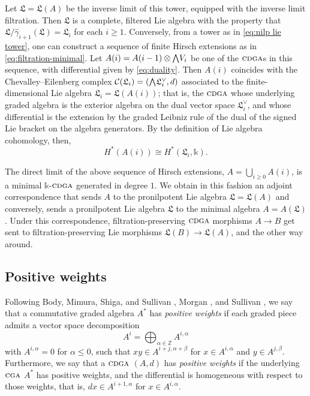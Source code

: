 \documentclass{article}
\numberwithin{equation}{section}
\theoremstyle{definition}
\newcommand{\Z}{\mathbb{Z}}
\renewcommand{\k}{\mathbb{k}}
\newcommand{\fL}{\mathfrak{L}}
\newcommand{\cga}{\ensuremath{\textsc{cga}}}
\newcommand{\cdga}{\ensuremath{\textsc{cdga}}}
\newcommand{\bwedge}{\mbox{\normalsize $\bigwedge$}}
\begin{document}
Let $\fL=\fL(A)$ be the inverse limit of this tower, equipped with the 
inverse limit filtration. Then $\fL$ is a complete, filtered Lie algebra 
with the property that $\fL/\widehat{\gamma}_{i+1}( \fL)=\fL_i$ 
for each $i\ge 1$.  Conversely, from a tower as in \eqref{eq:nilp lie tower}, 
one can construct a sequence of finite Hirsch extensions as 
in \eqref{eq:filtration-minimal}.  Let $A(i)=A(i-1)\otimes \bwedge V_{i}$ 
be one of the $\cdga$s in this sequence, with differential given by \eqref{eq:duality}.  
Then $A(i)$ coincides with the Chevalley--Eilenberg complex
$\mathcal{C}(\fL_i)=(\bwedge \fL_i^{\vee},d)$ associated to the finite-dimensional 
Lie algebra $\fL_i=\fL(A(i))$; that is, the $\cdga$ whose underlying 
graded algebra is the exterior algebra on the dual vector space 
$\fL_i^{\vee}$, and whose differential is the extension by the graded 
Leibniz rule of the dual of the signed Lie bracket on the algebra generators.  
By the definition of Lie algebra cohomology, then, 
\begin{equation}
\label{eq:ce}
H^{*}(A(i))\cong H^{*}(\fL_i, \k) .
\end{equation}

The direct limit of the above sequence of Hirsch 
extensions, $A= \bigcup_{i\ge 0}A(i)$, 
is a minimal $\k$-$\cdga$ generated in degree $1$.  
We obtain in this fashion an adjoint correspondence that sends $A$ to the  
pronilpotent Lie algebra $\fL=\fL(A)$  and conversely, sends a pronilpotent Lie 
algebra $\fL$ to the minimal algebra $A=A(\fL)$.     
Under this correspondence, filtration-preserving $\cdga$ morphisms   
$A \to B$ get sent to filtration-preserving Lie morphisms $\fL(B) \to \fL(A)$, 
and the other way around.

\subsection{Positive weights}
\label{subsec:posWeights}

Following Body, Mimura, Shiga, and Sullivan \cite{BMSS}, 
Morgan \cite{Mo}, and Sullivan \cite{Sullivan77}, we say that a commutative 
graded algebra $A^*$ has {\em positive weights}\/ if each graded 
piece admits a vector space decomposition 
\begin{equation}
\label{eq:weights-alg}
A^i=\bigoplus_{\alpha\in\Z}A^{i,\alpha}
\end{equation}
with $A^{i,\alpha}=0$ for $\alpha\leq 0$, such that $xy\in A^{i+j,\alpha+\beta}$ for 
$x\in A^{i,\alpha}$ and $y\in A^{j,\beta}$.  Furthermore, we say that a $\cdga$ 
$(A,d)$ has \emph{positive weights}\/ if the underlying $\cga$ $A^{*}$ has 
positive weights, and the differential is homogeneous with respect to those 
weights, that is, $d x\in A^{i+1,\alpha}$ for $x\in A^{i,\alpha}$.
\end{document}
